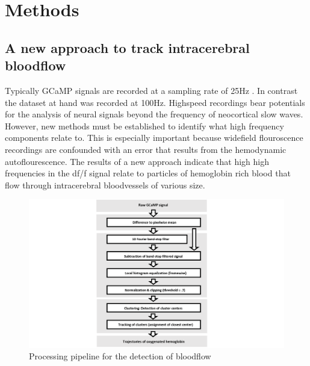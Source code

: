 
\chapter{Methods} %
\label{ChapterX} %




\section{A new approach to track intracerebral bloodflow}
Typically GCaMP signals are recorded at a sampling rate of 25Hz \parencite{celotto2020analysis}. In contrast the dataset at hand was recorded at 100Hz. Highspeed recordings bear potentials for the analysis of neural signals beyond the frequency of neocortical slow waves. However, new methods must be established to identify what high frequency components relate to. This is especially important because widefield flouroscence recordings are confounded with an error that results from the hemodynamic autoflourescence. The results of a new approach indicate that high high frequencies in the df/f signal relate to particles of hemoglobin rich blood that flow through intracerebral bloodvessels of various size.\\
\begin{figure}[th]
\centering
\includegraphics[width=\textwidth,height=\textheight,keepaspectratio]{Figures/tracking_bloodflow_pipeline}
\decoRule
\caption[Processing pipeline for the detection of bloodflow]{Processing pipeline for the detection of bloodflow}
\label{fig:clustering_approach_pipeline}
\end{figure}
